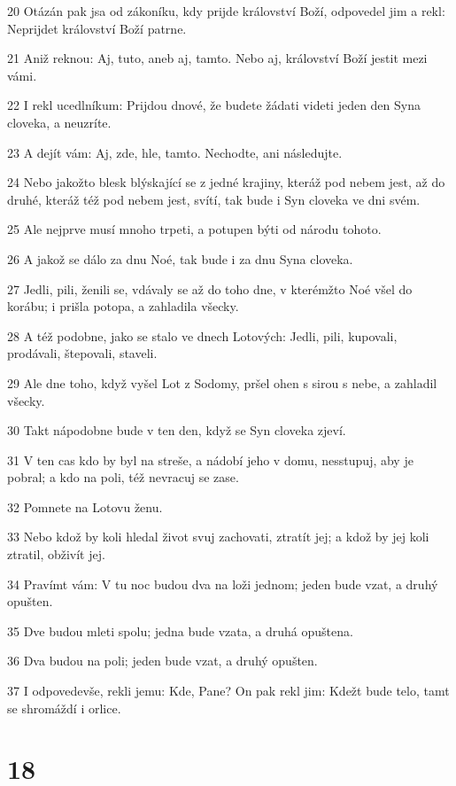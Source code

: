 \par 20 Otázán pak jsa od zákoníku, kdy prijde království Boží, odpovedel jim a rekl: Neprijdet království Boží patrne.
\par 21 Aniž reknou: Aj, tuto, aneb aj, tamto. Nebo aj, království Boží jestit mezi vámi.
\par 22 I rekl ucedlníkum: Prijdou dnové, že budete žádati videti jeden den Syna cloveka, a neuzríte.
\par 23 A dejít vám: Aj, zde, hle, tamto. Nechodte, ani následujte.
\par 24 Nebo jakožto blesk blýskající se z jedné krajiny, kteráž pod nebem jest, až do druhé, kteráž též pod nebem jest, svítí, tak bude i Syn cloveka ve dni svém.
\par 25 Ale nejprve musí mnoho trpeti, a potupen býti od národu tohoto.
\par 26 A jakož se dálo za dnu Noé, tak bude i za dnu Syna cloveka.
\par 27 Jedli, pili, ženili se, vdávaly se až do toho dne, v kterémžto Noé všel do korábu; i prišla potopa, a zahladila všecky.
\par 28 A též podobne, jako se stalo ve dnech Lotových: Jedli, pili, kupovali, prodávali, štepovali, staveli.
\par 29 Ale dne toho, když vyšel Lot z Sodomy, pršel ohen s sirou s nebe, a zahladil všecky.
\par 30 Takt nápodobne bude v ten den, když se Syn cloveka zjeví.
\par 31 V ten cas kdo by byl na streše, a nádobí jeho v domu, nesstupuj, aby je pobral; a kdo na poli, též nevracuj se zase.
\par 32 Pomnete na Lotovu ženu.
\par 33 Nebo kdož by koli hledal život svuj zachovati, ztratít jej; a kdož by jej koli ztratil, obživít jej.
\par 34 Pravímt vám: V tu noc budou dva na loži jednom; jeden bude vzat, a druhý opušten.
\par 35 Dve budou mleti spolu; jedna bude vzata, a druhá opuštena.
\par 36 Dva budou na poli; jeden bude vzat, a druhý opušten.
\par 37 I odpovedevše, rekli jemu: Kde, Pane? On pak rekl jim: Kdežt bude telo, tamt se shromáždí i orlice.

\chapter{18}

